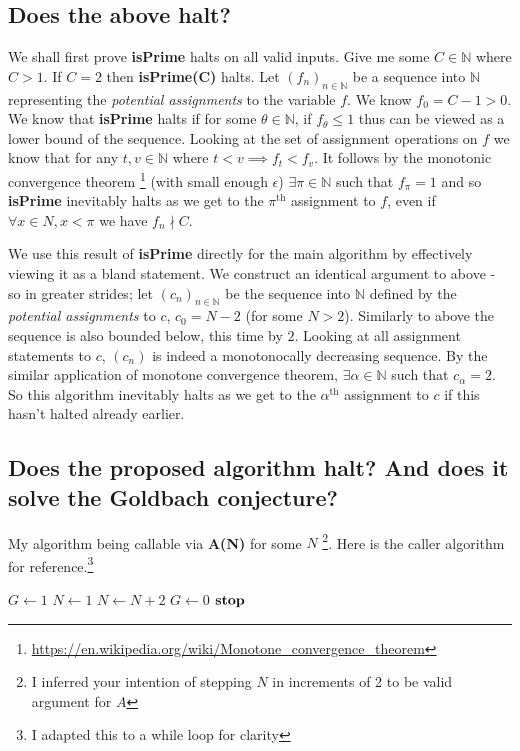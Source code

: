 \documentclass{article}
\begin{document}
\subsection{Does the above halt?}
We shall first prove \textbf{isPrime} halts on all valid inputs. Give me some $C \in \mathbb{N}$ where $C>1$. If $C=2$ then \textbf{isPrime(C)} halts. Let $(f_n)_{n\in\mathbb{N}}$ be a sequence into $\mathbb{N}$ representing the \emph{potential assignments} to the variable $f$. We know $f_0 = C - 1 > 0$. We know that \textbf{isPrime} halts if for some $\theta \in \mathbb{N}$, if $f_{\theta} \leq 1$ thus can be viewed as a lower bound of the sequence. Looking at the set of assignment operations on $f$ we know that for any $t,v \in \mathbb{N}$ where $t < v \implies f_t < f_v$. It follows by the monotonic convergence theorem \footnote{\url{https://en.wikipedia.org/wiki/Monotone_convergence_theorem}} (with small enough $\epsilon$) $\exists \pi \in \mathbb{N}$ such that $f_{\pi} = 1$ and so \textbf{isPrime} inevitably halts as we get to the $\pi^{\text{th}}$ assignment to $f$, even if $\forall x \in N, x< \pi$ we have $f_n \nmid C$.

We use this result of \textbf{isPrime} directly for the main algorithm by effectively viewing it as a bland statement. We construct an identical argument to above - so in greater strides; let $(c_n)_{n\in\mathbb{N}}$ be the sequence into $\mathbb{N}$ defined by the \emph{potential assignments} to $c$, $c_0 = N - 2$ (for some $N > 2$). Similarly to above the sequence is also bounded below, this time by $2$. Looking at all assignment statements to $c$, $(c_n)$ is indeed a monotonocally decreasing sequence. By the similar application of monotone convergence theorem, $\exists \alpha \in \mathbb{N}$ such that $c_{\alpha} = 2$. So this algorithm inevitably halts as we get to the $\alpha^{\text{th}}$ assignment to $c$ if this hasn't halted already earlier.

\pagebreak
\subsection{Does the proposed algorithm halt? And does it solve the Goldbach conjecture?}
My algorithm being callable via \textbf{A(N)} for some $N$ \footnote{I inferred your intention of stepping $N$ in increments of 2 to be valid argument for $A$}. Here is the caller algorithm for reference.\footnote{I adapted this to a while loop for clarity}


\begin{algorithmic}[1]
	\STATE $G \leftarrow 1$
	\STATE $N \leftarrow 1$
			\STATE $N \leftarrow N + 2$
		\ENDWHILE
		\STATE $G \leftarrow 0$
	\STATE $\text{\textbf{stop}}$ 
\end{algorithmic}
\end{document}
